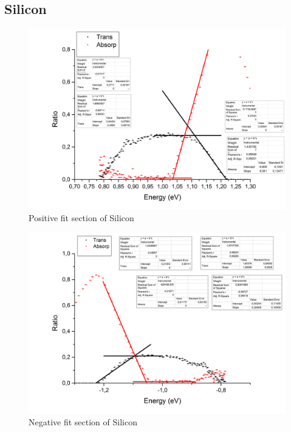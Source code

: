 \subsection*{Silicon}
\begin{figure}[h]
\begin{center}
\includegraphics[scale=0.25]{Bilder/Teil1/V1_Si_positiv}
\caption{Positive fit section of Silicon}
\label{fig:SiPo}
\end{center}
\end{figure}
\begin{figure}[ht!]
\begin{center}
\includegraphics[scale=0.25]{Bilder/Teil1/V1_Si_negativ}
\caption{Negative fit section of Silicon}
\label{fig:SiNe}
\end{center}
\end{figure}